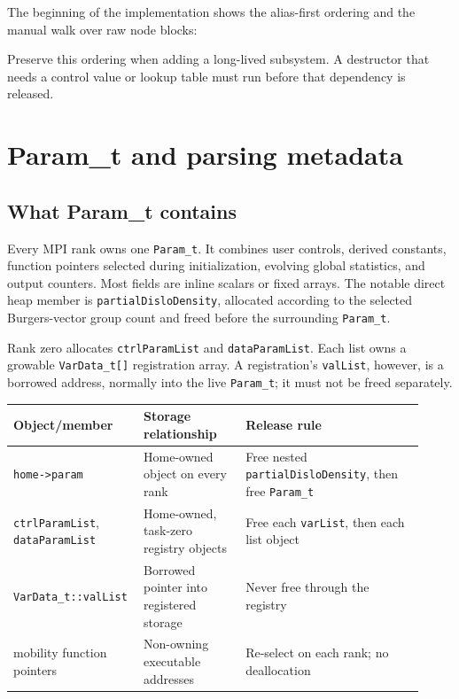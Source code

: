 \documentclass[11pt]{article}
\newcommand{\code}[1]{\texorpdfstring{\nolinkurl{#1}}{#1}}
\begin{document}
The beginning of the implementation shows the alias-first ordering and the
manual walk over raw node blocks:



Preserve this ordering when adding a long-lived subsystem.  A destructor that
needs a control value or lookup table must run before that dependency is
released.

\section{Param\_t and parsing metadata}

\subsection{What Param\_t contains}

Every MPI rank owns one \code{Param_t}.  It combines user controls, derived
constants, function pointers selected during initialization, evolving global
statistics, and output counters.  Most fields are inline scalars or fixed
arrays.  The notable direct heap member is
\code{partialDisloDensity}, allocated according to the selected Burgers-vector
group count and freed before the surrounding \code{Param_t}.

Rank zero allocates \code{ctrlParamList} and \code{dataParamList}.  Each list
owns a growable \code{VarData_t[]} registration array.  A registration's
\code{valList}, however, is a borrowed address, normally into the live
\code{Param_t}; it must not be freed separately.

\begin{longtable}{@{}p{0.26\linewidth}p{0.24\linewidth}p{0.42\linewidth}@{}}
\toprule
Object/member & Storage relationship & Release rule \\
\midrule
\endhead
\code{home->param} & Home-owned object on every rank & Free nested
\code{partialDisloDensity}, then free \code{Param_t} \\
\code{ctrlParamList}, \code{dataParamList} & Home-owned, task-zero registry
objects & Free each \code{varList}, then each list object \\
\code{VarData_t::valList} & Borrowed pointer into registered storage & Never
free through the registry \\
mobility function pointers & Non-owning executable addresses & Re-select on
each rank; no deallocation \\
\bottomrule
\end{longtable}
\end{document}
